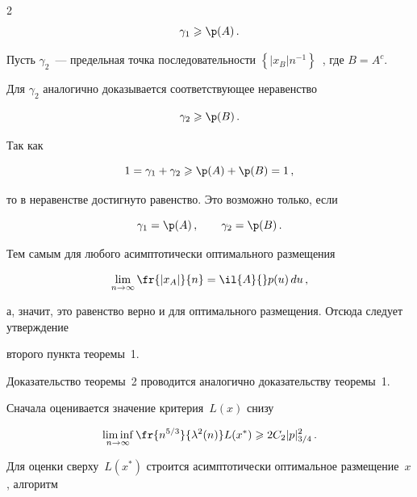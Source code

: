 \begin{multicols}{2}
$$


\gamma_1 \geqslant{\p}(A)\,.


$$


Пусть $\gamma_2$~--- предельная точка последовательности $\left\{\left|x_B\right|n^{-1}


\right\}$~, где $B=A^c$.





Для $\gamma_2$ аналогично доказывается соответству\-ющее неравенство


$$


\gamma_2 \geqslant {\p}(B)\,.


$$





Так как


$$


1=\gamma_1+\gamma_2\geqslant {\p}(A)+{\p}(B)=1\,,


$$


то в неравенстве достигнуто равенство. Это возможно только, если


$$


\gamma_1={\p}(A)\,, \qquad \gamma_2={\p}(B)\,.


$$


Тем самым для любого асимптотически оптимального размещения


$$


\liml{n\rightarrow\infty}\fr{\left|x_A\right|}{n}=\il{A}{}p(u)\,du\,,


$$


а, значит, это равенство верно и для оптимального размещения. Отсюда следует утверждение


второго пункта теоремы~1.





Доказательство теоремы~2 проводится аналогично доказательству теоремы~1.





Сначала оценивается значение критерия~$L(x)$ снизу


$$


\limi{n \to \infty} \fr{n^{5/3}}{\lambda^2(n)}L(x^*)\geqslant 2C_2|p|_{3/4}^2\,.


$$





Для оценки сверху~$L(x^*)$ строится асимптотически оптимальное размещение~$x$, алгоритм



\end{multicols}
